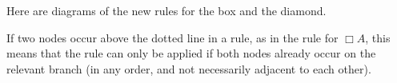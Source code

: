 Here are diagrams of the new rules for the box and the diamond.

\bigskip\noindent%
\begin{minipage}{0.24\textwidth} \centering
{}
\end{minipage}
\begin{minipage}{0.26\textwidth}\centering
{}
\end{minipage}
\begin{minipage}{0.26\textwidth}\centering
{}
\end{minipage}
\begin{minipage}{0.24\textwidth} \centering
{}
\end{minipage}

\bigskip\noindent%
If two nodes occur above the dotted line in a rule, as in the rule for $\Box A$,
this means that the rule can only be applied if both nodes already occur on the
relevant branch (in any order, and not necessarily adjacent to each other).

